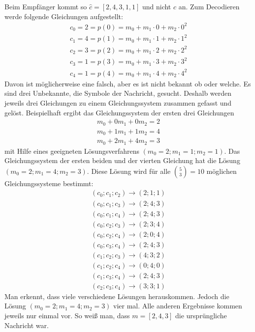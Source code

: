 Beim Empfänger kommt so $\hat{c}=[2,4,3,1,1]$ und nicht $c$ an.
Zum Decodieren werde folgende Gleichungen aufgestellt:
\begin{gather}
c_0=2=p(0)=m_0+m_1\cdot0+m_2\cdot0^2 \nonumber\\
c_1=4=p(1)=m_0+m_1\cdot1+m_2\cdot1^2 \nonumber\\
c_2=3=p(2)=m_0+m_1\cdot2+m_2\cdot2^2 \nonumber\\
c_3=1=p(3)=m_0+m_1\cdot3+m_2\cdot3^2 \nonumber\\
c_4=1=p(4)=m_0+m_1\cdot4+m_2\cdot4^2 \nonumber
\end{gather}
Davon ist möglicherweise eine falsch, aber es ist nicht bekannt ob oder welche.
Es sind drei Unbekannte, die Symbole der Nachricht, gesucht.
Deshalb werden jeweils drei Gleichungen zu einem Gleichungssystem zusammen gefasst und gelöst.
Beispielhaft ergibt das Gleichungssystem der ersten drei Gleichungen
\begin{gather}
m_0+0m_1+0m_2=2 \nonumber\\
m_0+1m_1+1m_2=4 \nonumber\\
m_0+2m_1+4m_2=3 \nonumber
\end{gather}
mit Hilfe eines geeigneten Lösungsverfahrens $(m_0=2; m_1=1; m_2=1)$.
Das Gleichungssystem der ersten beiden und der vierten Gleichung hat die Lösung $(m_0=2; m_1=4; m_2=3)$.
Diese Lösung wird für alle $\binom{5}{3}=10$ möglichen Gleichungssysteme bestimmt: 
\begin{gather}
(c_0; c_1; c_2)\rightarrow(2;1;1) \nonumber\\
(c_0; c_1; c_3)\rightarrow(2;4;3) \nonumber\\
(c_0; c_1; c_4)\rightarrow(2;4;3) \nonumber\\
(c_0; c_2; c_3)\rightarrow(2;3;4) \nonumber\\
(c_0; c_2; c_4)\rightarrow(2;0;4) \nonumber\\
(c_0; c_3; c_4)\rightarrow(2;4;3) \nonumber\\
(c_1; c_2; c_3)\rightarrow(4;3;2) \nonumber\\
(c_1; c_2; c_4)\rightarrow(0;4;0) \nonumber\\
(c_1; c_3; c_4)\rightarrow(2;4;3) \nonumber\\
(c_2; c_3; c_4)\rightarrow(3;3;1) \nonumber
\end{gather}
Man erkennt, dass viele verschiedene Lösungen herauskommen.
Jedoch die Lösung $(m_0=2; m_1=4; m_2=3)$ vier mal.
Alle anderen Ergebnisse kommen jeweils nur einmal vor.
So weiß man, dass $m=[2,4,3]$ die ursprüngliche Nachricht war.

